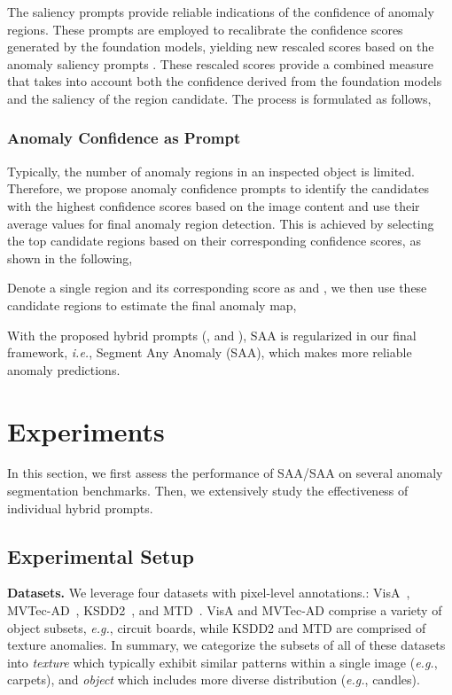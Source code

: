 \documentclass{article}
\begin{document}
The saliency prompts provide reliable indications of the confidence of anomaly regions. These prompts are employed to recalibrate the confidence scores generated by the foundation models, yielding new rescaled scores  based on the anomaly saliency prompts . These rescaled scores provide a combined measure that takes into account both the confidence derived from the foundation models and the saliency of the region candidate. The process is formulated as follows,


\subsubsection{Anomaly Confidence as Prompt}

Typically, the number of anomaly regions in an inspected object is limited. Therefore, we propose anomaly confidence prompts  to identify the  candidates with the highest confidence scores based on the image content and use their average values for final anomaly region detection. This is achieved by selecting the top  candidate regions based on their corresponding confidence scores, as shown in the following,


Denote a single region and its corresponding score as  and , we then use these  candidate regions to estimate the final anomaly map, 


With the proposed hybrid prompts (, and ), SAA is regularized in our final framework, \textit{i.e.}, Segment Any Anomaly  (SAA), which makes more reliable anomaly predictions.



\section{Experiments}
\label{sec:experiment}
In this section, we first assess the performance of SAA/SAA on several anomaly segmentation benchmarks. Then, we extensively study the effectiveness of individual hybrid prompts.

\subsection{Experimental Setup}

\noindent\textbf{Datasets.} We leverage four datasets with pixel-level annotations.: VisA~\cite{zou2022spot}, MVTec-AD~\cite{bergmann2019mvtec}, KSDD2~\cite{bozic_mixed_2021}, and MTD~\cite{mtd2018}. VisA and MVTec-AD comprise a variety of object subsets, \textit{e.g.}, circuit boards, while KSDD2 and MTD are comprised of texture anomalies. 
In summary, we categorize the subsets of all of these datasets into \textit{texture} which typically exhibit similar patterns within a single image (\textit{e.g.}, carpets), and \textit{object}  which includes more diverse distribution (\textit{e.g.}, candles). 
\end{document}

